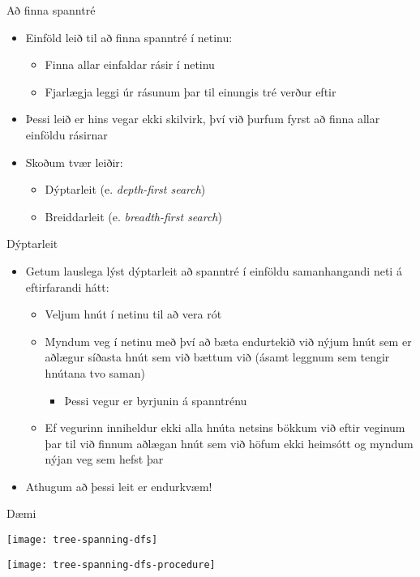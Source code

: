 \documentclass[handout]{beamer}
\begin{document}
\begin{frame}{Að finna spanntré}
\begin{itemize}
 \item Einföld leið til að finna spanntré í netinu: 
 \begin{itemize}
  \item Finna allar einfaldar rásir í netinu
  \item Fjarlægja leggi úr rásunum þar til einungis tré verður eftir
 \end{itemize}
 \item Þessi leið er hins vegar ekki skilvirk, því við þurfum fyrst að finna allar einföldu rásirnar
 \item Skoðum tvær leiðir:
 \begin{itemize}
  \item Dýptarleit (e. \emph{depth-first search})
  \item Breiddarleit (e. \emph{breadth-first search})
 \end{itemize}
\end{itemize}
\end{frame}

\begin{frame}{Dýptarleit}
\begin{itemize}
 \item Getum lauslega lýst dýptarleit að spanntré í einföldu samanhangandi neti á eftirfarandi hátt:
 \begin{itemize}
  \item Veljum hnút í netinu til að vera rót
  \item Myndum veg í netinu með því að bæta endurtekið við nýjum hnút sem er aðlægur síðasta hnút sem við bættum við (ásamt leggnum sem tengir hnútana tvo saman)
  \begin{itemize}
   \item Þessi vegur er byrjunin á spanntrénu
  \end{itemize}
  \item Ef vegurinn inniheldur ekki alla hnúta netsins bökkum við eftir veginum þar til við finnum aðlægan hnút sem við höfum ekki heimsótt og myndum nýjan veg sem hefst þar
 \end{itemize}
 \item Athugum að þessi leit er endurkvæm!
\end{itemize}
\end{frame}

\begin{frame}{Dæmi}
\begin{center}
\texttt{[image: tree-spanning-dfs]}

\pause
\texttt{[image: tree-spanning-dfs-procedure]}
\end{center}

\end{frame}
\end{document}
